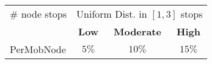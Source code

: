 \begin{table}[!t]
{\begin{tabular}{llcc}
\# node stops                       & \multicolumn{3}{l}{Uniform Dist. in $[1, 3]$ stops}                         \\ %
                                    & \multicolumn{1}{c}{\textbf{Low}}    & \textbf{Moderate}   & \textbf{High}   \\
PerMobNode                          & \multicolumn{1}{c}{$5\%$}           & $10\%$              & $15\%$          \\ \hline
\end{tabular}
}
\end{table}